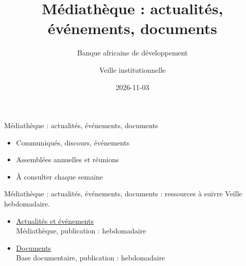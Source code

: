 \documentclass[aspectratio=169,11pt]{beamer}
\title{Médiathèque : actualités, événements, documents}
\subtitle{Banque africaine de développement}
\author{Veille institutionnelle}
\date{2026-11-03}
\begin{document}
\begin{frame}\titlepage\end{frame}

\begin{frame}{Médiathèque : actualités, événements, documents}
\begin{itemize}
\item Communiqués, discours, événements
\item Assemblées annuelles et réunions
\item À consulter chaque semaine
\end{itemize}
\end{frame}

\begin{frame}{Médiathèque : actualités, événements, documents : ressources à suivre}
\small
Veille hebdomadaire.
\begin{itemize}
\item \href{https://www.afdb.org/en/news-and-events}{Actualités et événements}\\{\footnotesize Médiathèque, publication : hebdomadaire}
\item \href{https://www.afdb.org/en/documents}{Documents}\\{\footnotesize Base documentaire, publication : hebdomadaire}
\end{itemize}
\end{frame}
\end{document}

